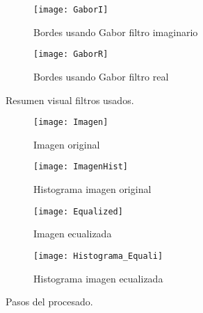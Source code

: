 \begin{figure}
	\begin{subfigure}[c]{.5\linewidth}
	\centering\large \texttt{[image: GaborI]}
	\caption{Bordes usando Gabor filtro imaginario}
	\end{subfigure}%
	\begin{subfigure}[c]{.5\linewidth}
	\centering\large \texttt{[image: GaborR]}
	\caption{Bordes usando Gabor filtro real}
	\end{subfigure}

\caption{Resumen visual filtros usados.}\label{fig:1.2}
\end{figure}



\begin{figure}

	\begin{subfigure}[c]{.5\linewidth}
	\centering\large \texttt{[image: Imagen]}
	\caption{Imagen original}
	\end{subfigure}%
	\begin{subfigure}[c]{.5\linewidth}
	\centering\large \texttt{[image: ImagenHist]}
	\caption{Histograma imagen original}
	\end{subfigure}%

	\begin{subfigure}[c]{.5\linewidth}
	\centering\large \texttt{[image: Equalized]}
	\caption{Imagen ecualizada}
	\end{subfigure}%
	\begin{subfigure}[c]{.5\linewidth}
	\centering\large \texttt{[image: Histograma\_Equali]}
	\caption{Histograma imagen ecualizada}
	\end{subfigure}%

\caption{Pasos del procesado.}\label{fig:2.1}
\end{figure}

